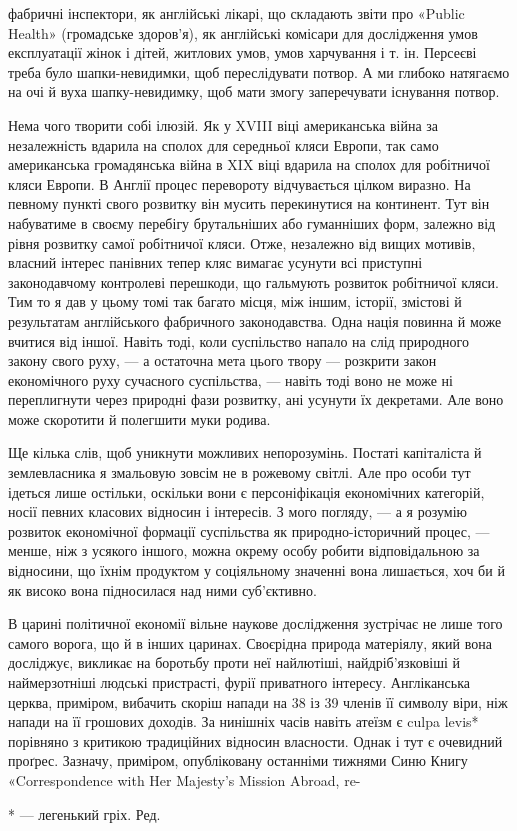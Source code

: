 фабричні інспектори, як англійські лікарі, що складають звіти
про «Public Health» (громадське здоров’я), як англійські комісари
для дослідження умов експлуатації жінок і дітей, житлових
умов, умов харчування і т. ін. Персеєві треба було шапки-невидимки,
щоб переслідувати потвор. А ми глибоко натягаємо на очі
й вуха шапку-невидимку, щоб мати змогу заперечувати існування
потвор.

Нема чого творити собі ілюзій. Як у XVIII віці американська
війна за незалежність вдарила на сполох для середньої кляси
Европи, так само американська громадянська війна в XIX віці
вдарила на сполох для робітничої кляси Европи. В Англії процес
перевороту відчувається цілком виразно. На певному пункті свого
розвитку він мусить перекинутися на континент. Тут він набуватиме
в своєму перебігу брутальніших або гуманніших форм, залежно
від рівня розвитку самої робітничої кляси. Отже, незалежно
від вищих мотивів, власний інтерес панівних тепер кляс вимагає
усунути всі приступні законодавчому контролеві перешкоди, що
гальмують розвиток робітничої кляси. Тим то я дав у цьому
томі так багато місця, між іншим, історії, змістові й результатам
англійського фабричного законодавства. Одна нація повинна й
може вчитися від іншої. Навіть тоді, коли суспільство напало на
слід природного закону свого руху, — а остаточна мета цього
твору — розкрити закон економічного руху сучасного суспільства,
— навіть тоді воно не може ні переплигнути через природні
фази розвитку, ані усунути їх декретами. Але воно може скоротити
й полегшити муки родива.

Ще кілька слів, щоб уникнути можливих непорозумінь. Постаті
капіталіста й землевласника я змальовую зовсім не в рожевому
світлі. Але про особи тут ідеться лише остільки, оскільки вони є
персоніфікація економічних категорій, носії певних класових
відносин і інтересів. З мого погляду, — а я розумію розвиток економічної
формації суспільства як природно-історичний процес, —
менше, ніж з усякого іншого, можна окрему особу робити відповідальною
за відносини, що їхнім продуктом у соціяльному значенні
вона лишається, хоч би й як високо вона підносилася над
ними суб’єктивно.

В царині політичної економії вільне наукове дослідження
зустрічає не лише того самого ворога, що й в інших царинах.
Своєрідна природа матеріялу, який вона досліджує, викликає на
боротьбу проти неї найлютіші, найдріб’язковіші й наймерзотніші
людські пристрасті, фурії приватного інтересу. Англіканська
церква, приміром, вибачить скоріш напади на 38 із 39 членів
її символу віри, ніж напади на  її грошових доходів. За нинішніх
часів навіть атеїзм є culpa levis* порівняно з критикою
традиційних відносин власности. Однак і тут є очевидний проґрес.
Зазначу, приміром, опубліковану останніми тижнями Синю
Книгу «Correspondence with Her Majesty’s Mission Abroad, re-

* — легенький гріх. Ред.
